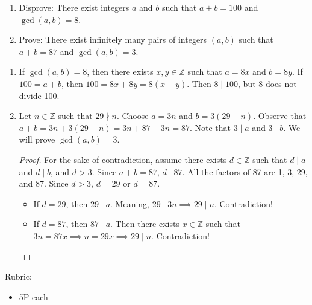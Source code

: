 \documentclass{article}
\newcommand{\Z}{\mathbb{Z}}
\theoremstyle{definition}
\begin{document}
\begin{question}
    \begin{enumerate}
        \item Disprove: There exist integers $a$ and $b$ such that $a+b=100$ and $\gcd(a, b)=8$.
        \item Prove: There exist infinitely many pairs of integers $(a,b)$ such that $a+b=87$ and $\gcd(a, b)=3$.
    \end{enumerate}
\end{question}
\begin{solution}
\begin{enumerate}
    \item If $\gcd(a, b)=8$, then there exists $x, y\in \Z$ such that $a=8x$ and $b=8y$. If $100=a+b$, then $100=8x+8y=8(x+y)$. Then $8\mid 100$, but 8 does not divide 100.
    \item Let $n\in \Z$ such that $29\nmid n$. Choose $a=3n$ and $b=3(29-n)$. Observe that $a+b = 3n + 3(29-n) = 3n + 87-3n = 87$. Note that $3\mid a$ and $3\mid b$. We will prove $\gcd(a, b)=3$.
    \begin{proof}
    For the sake of contradiction, assume there exists $d\in \Z$ such that $d\mid a$ and $d\mid b$, and $d>3$. Since $a+b=87$, $d\mid 87$. All the factors of 87 are 1, 3, 29, and 87. Since $d>3$, $d=29$ or $d=87$. 
    \begin{itemize}
    \item If $d=29$, then $29\mid a$. Meaning, $29\mid 3n \implies 29\mid n$. Contradiction!
    \item If $d=87$, then $87\mid a$. Then there exists $x\in \Z$ such that $3n=87x\implies n=29x\implies 29\mid n$. Contradiction!
    \end{itemize}
    \end{proof}

\end{enumerate}

{\color{red} Rubric:
\begin{itemize}
\item 5P each
\end{itemize}}
\end{solution}
\end{document}
